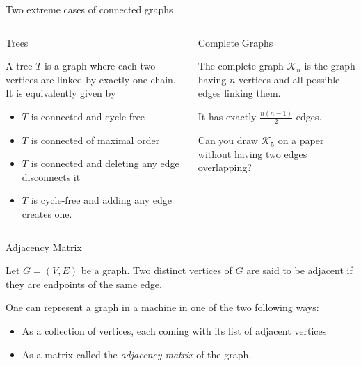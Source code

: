\documentclass[32pt,aspectratio=169]{beamer}
\begin{document}
\begin{frame}{Two extreme cases of connected graphs}
  \begin{columns}[T]
    \begin{column}{.55\textwidth}
      \begin{halfshyblock}{Trees}
        {\small
        A tree $T$ is a graph where each two vertices are linked by
        exactly one chain. It is equivalently given by
        \begin{itemize}
        \item $T$ is connected and cycle-free
        \item $T$ is connected of maximal order
        \item $T$ is connected and deleting any edge disconnects it
        \item $T$ is cycle-free and adding any edge creates one.
        \end{itemize}
        }
      \end{halfshyblock}
    \end{column}
    \begin{column}{.55\textwidth}
      \begin{halfshyblock}{Complete Graphs}
        {\small
        The complete graph $\mathcal{K}_n$ is the graph having $n$
        vertices and all possible edges linking them.

        \vspace{\baselineskip}

        It has exactly $\displaystyle{\frac{n(n-1)}{2}}$ edges.

        \vspace{\baselineskip}

        Can you draw $\mathcal{K}_5$ on a paper without having two
        edges overlapping?
        }
      \end{halfshyblock}
    \end{column}
  \end{columns}
\end{frame}

\begin{frame}{Adjacency Matrix}
  \begin{defn}
    Let $G = (V, E)$ be a graph. Two distinct vertices of $G$ are said
    to be adjacent if they are endpoints of the same edge.
  \end{defn}
  \pause One can represent a graph in a machine in one of the two
  following ways:
  \begin{itemize}
  \item<3->[\textcolor<5->{lightgray!30!white}{\textbullet}]
  \textcolor<5->{lightgray!30!white}{As a collection of vertices, each
    coming with its list of adjacent vertices}
  \item<4-> As a matrix called the \emph{adjacency matrix} of the graph.
  \end{itemize}
\end{frame}
\end{document}
